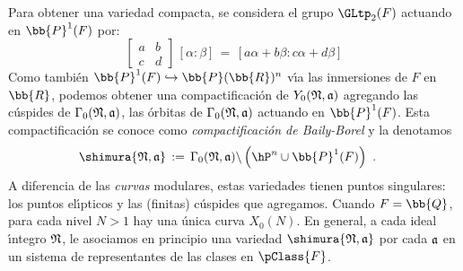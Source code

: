 Para obtener una variedad compacta, se considera el grupo $\GLtp_{2}(F)$
actuando en $\bb{P}^{1}(F)$ por:
\begin{equation}
	\label{eq:accionenlascuspides}
	\begin{bmatrix} a & b \\ c & d \end{bmatrix}\,[\alpha:\beta]
		\,=\,[a\alpha+b\beta:c\alpha+d\beta]
\end{equation}
%
Como tambi\'{e}n $\bb{P}^{1}(F)\hookrightarrow\bb{P}(\bb{R})^{n}$ v\'{\i}a las
inmersiones de $F$ en $\bb{R}$, podemos obtener una compactificaci\'{o}n de
$Y_{0}(\frak{N},\frak{a})$ agregando las c\'{u}spides de
$\Gamma_{0}(\frak{N},\frak{a})$, las \'{o}rbitas de
$\Gamma_{0}(\frak{N},\frak{a})$ actuando en $\bb{P}^{1}(F)$. Esta
compactificaci\'{o}n se conoce como \emph{compactificaci\'{o}n de %
Baily-Borel} \cite[Ch.~II, \S~7]{vanDerGeerSurfaces} y la denotamos
\begin{align*}
	\shimura{\frak{N},\frak{a}} & \,:=\,
		\Gamma_{0}(\frak{N},\frak{a})\backslash
		\left(\hP^{n}\cup\bb{P}^{1}(F)\right)
	\text{ .}
\end{align*}
%
A diferencia de las \emph{curvas} modulares, estas variedades tienen
puntos singulares: los puntos el\'{\i}pticos y las (finitas) c\'{u}spides
que agregamos. Cuando $F=\bb{Q}$, para cada nivel $N>1$ hay una \'{u}nica
curva $X_{0}(N)$. En general, a cada ideal \'{\i}ntegro $\frak{N}$, le
asociamos en principio una variedad $\shimura{\frak{N},\frak{a}}$ por cada
$\frak{a}$ en un sistema de representantes de las clases en $\pClass{F}$.
